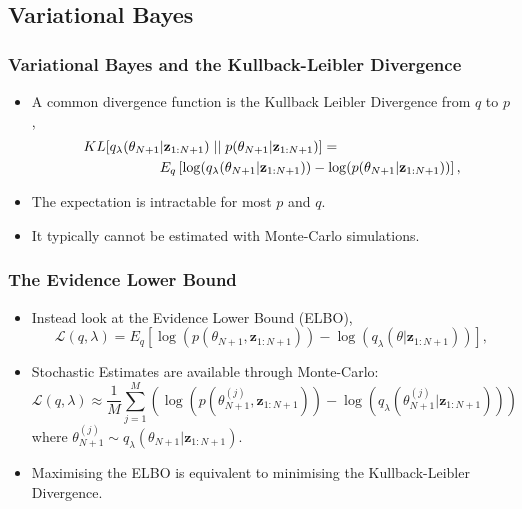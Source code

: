 \documentclass[11pt]{beamer}\usepackage[]{graphicx}\usepackage[]{color}
\begin{document}
\begin{frame}
\subsection{Variational Bayes}
\frametitle{Variational Bayes and the Kullback-Leibler Divergence}
\begin{itemize}
\item A common divergence function is the Kullback Leibler Divergence from $q$ to $p$,
\begin{align*}
\label{KL-def}
KL[q_{\lambda}(\theta_{N+1} &| \textbf{z}_{1:N+1})\hspace{.1cm}||\hspace{.1cm}p(\theta_{N+1} | \textbf{z}_{1:N+1})] = \\
&E_q \left[ \log(q_{\lambda}(\theta_{N+1} | \textbf{z}_{1:N+1})) - \log(p(\theta_{N+1} | \textbf{z}_{1:N+1})) \right],
\end{align*}
\pause
\item The expectation is intractable for most $p$ and $q$.
\item It typically cannot be estimated with Monte-Carlo simulations.
\end{itemize}
\end{frame}

\begin{frame}
\frametitle{The Evidence Lower Bound}
\begin{itemize}
\item Instead look at the Evidence Lower Bound (ELBO), $$\mathcal{L}(q, \lambda) = E_{q} \left[\log(p(\theta_{N+1}, \textbf{z}_{1:N+1})) - \log(q_{\lambda}(\theta | \textbf{z}_{1:N+1}))\right],$$
\pause
\item Stochastic Estimates are available through Monte-Carlo: $$\mathcal{L}(q, \lambda) \approx \frac{1}{M} \sum_{j=1}^M \left(\log(p(\theta_{N+1}^{(j)}, \textbf{z}_{1:N+1})) - \log(q_{\lambda}(\theta_{N+1}^{(j)} | \textbf{z}_{1:N+1})) \right)$$ where $\theta_{N+1}^{(j)} \sim q_{\lambda}(\theta_{N+1} | \textbf{z}_{1:N+1})$.
\pause
\item Maximising the ELBO is equivalent to minimising the Kullback-Leibler Divergence.
\end{itemize}
\end{frame}
\end{document}
